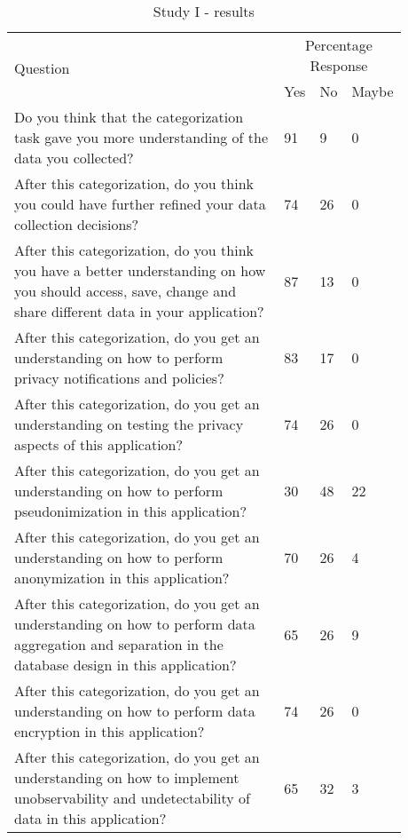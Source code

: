 \documentclass{sigchi}
\begin{document}
\begin{center}
\begin{table*}[htbp]
\caption{Study I - results}
\begin{center}

\begin{tabular}{|p{0.7\linewidth}|p{0.06\linewidth}|p{0.06\linewidth}|p{0.06\linewidth}|} 
\hline
\multirow{2}{*}{Question}& \multicolumn{3}{|c|}{Percentage Response}\\   \cline{2-4}
&Yes&No&Maybe\\
\hline
Do you think that the categorization task gave you more understanding of the data you collected? & 91 & 9 & 0\\
\hline
After this categorization, do you think you could have further refined your data collection decisions? & 74 & 26 & 0 \\
\hline
After this categorization, do you think you have a better understanding on how you should access, save, change and share different data in your application? & 87 & 13 & 0 \\
\hline
After this categorization, do you get an understanding on how to perform privacy notifications and policies? & 83 & 17 & 0\\
\hline
After this categorization, do you get an understanding on testing the privacy aspects of this application? & 74 & 26 & 0\\
\hline
After this categorization, do you get an understanding on how to perform pseudonimization in this application? & 30 & 48 & 22\\
\hline
After this categorization, do you get an understanding on how to perform anonymization in this application? & 70 & 26 & 4\\
\hline
After this categorization, do you get an understanding on how to perform data aggregation and  separation in the database design in this application? & 65 & 26 & 9 \\
\hline
After this categorization, do you get an understanding on how to perform data encryption in this application? & 74 & 26 & 0 \\
\hline
After this categorization, do you get an understanding on how to implement unobservability and undetectability of data in this application? & 65 & 32 & 3 \\
\hline
\end{tabular}

\end{center}
\end{table*}
\end{center}
\end{document}
